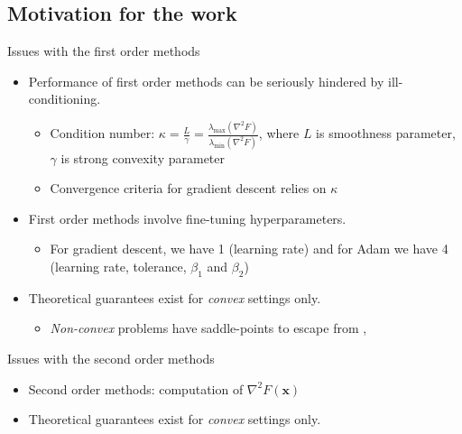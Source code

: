 \documentclass[10pt]{beamer}
\newcommand{\h}{\nabla^{2}}
\newcommand{\xbold}{\mathbf{x}}
\newcommand{\mineig}{\lambda_{\min}}
\newcommand{\maxeig}{\lambda_{\max}}
\begin{document}
\subsection{Motivation for the work}
\begin{frame}{Issues with the first order methods}
  \begin{itemize}
  \item<1->{
    Performance of first order methods can be seriously hindered by ill-conditioning.
    \begin{itemize}    
        \item<2->{Condition number: \(\kappa = \frac{L}{\gamma} = \frac{\maxeig(\h F)}{\mineig(\h F)}\), where \(L\) is smoothness parameter, \(\gamma\) is strong convexity parameter}
        \item<3->{Convergence criteria for gradient descent relies on \(\kappa\) \cite{benrecht-simons}}
    \end{itemize}
  }
  \item<4->{
    First order methods involve fine-tuning hyperparameters.
    \begin{itemize}    
        \item<5->{For gradient descent, we have 1 (learning rate) and for Adam \cite{adam-iclr} we have 4 (learning rate, tolerance, \(\beta_{1}\) and \(\beta_{2}\))}
    \end{itemize}
  }
  \item<6->{
    Theoretical guarantees exist for \emph{convex} settings only.
    \begin{itemize}    
        \item<7->{\emph{Non-convex} problems have saddle-points to escape from \cite{du-nips}, \cite{jin-icml}}
    \end{itemize}
  }
  \end{itemize}
\end{frame}

\begin{frame}{Issues with the second order methods}
  \begin{itemize}
  \item<1-> {
    Second order methods: computation of \(\h F(\xbold)\)
    \begin{itemize}
    \end{itemize}
  }
  \item<4->{
    Theoretical guarantees exist for \emph{convex} settings only.
  }
  \end{itemize}
\end{frame}
\end{document}
